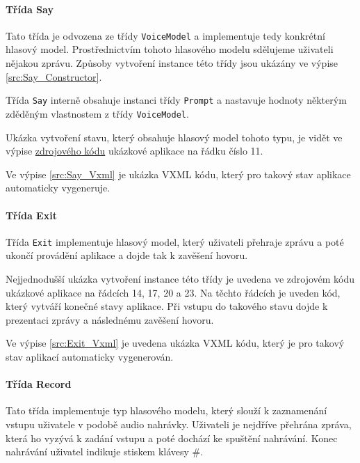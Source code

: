 \documentclass[ing,male,java,dept460,twoside]{diploma}						%
\begin{document}
\paragraph{Třída Say}
\label{sec:Say}
Tato třída je odvozena ze třídy \texttt{VoiceModel} a implementuje tedy konkrétní hlasový model. Prostřednictvím tohoto hlasového modelu sdělujeme uživateli nějakou zprávu. Způsoby vytvoření instance této třídy jsou ukázány ve výpise \ref{src:Say_Constructor}.



Třída \texttt{Say} interně obsahuje instanci třídy \texttt{Prompt} a nastavuje hodnoty některým zděděným vlastnostem z třídy \texttt{VoiceModel}.

Ukázka vytvoření stavu, který obsahuje hlasový model tohoto typu, je vidět ve výpise \hyperref[src:MenuExample]{zdrojového kódu} ukázkové aplikace na řádku číslo 11.

Ve výpise \ref{src:Say_Vxml} je ukázka VXML kódu, který pro takový stav aplikace automaticky vygeneruje.



\paragraph{Třída Exit}
\label{sec:Exit}
Třída \texttt{Exit} implementuje hlasový model, který uživateli přehraje zprávu a poté ukončí provádění aplikace a dojde tak k zavěšení hovoru.

Nejjednodušší ukázka vytvoření instance této třídy je uvedena ve zdrojovém kódu ukázkové aplikace na řádcích 14, 17, 20 a 23. Na těchto řádcích je uveden kód, který vytváří konečné stavy aplikace. Při vstupu do takového stavu dojde k prezentaci zprávy a následnému zavěšení hovoru.

Ve výpise \ref{src:Exit_Vxml} je uvedena ukázka VXML kódu, který je pro takový stav aplikací automaticky vygenerován.



\paragraph{Třída Record}
\label{sec:Record}
Tato třída implementuje typ hlasového modelu, který slouží k zaznamenání vstupu uživatele v podobě audio nahrávky. Uživateli je nejdříve přehrána zpráva, která ho vyzývá k zadání vstupu a poté dochází ke spuštění nahrávání. Konec nahrávání uživatel indikuje stiskem klávesy \#.
\end{document}

